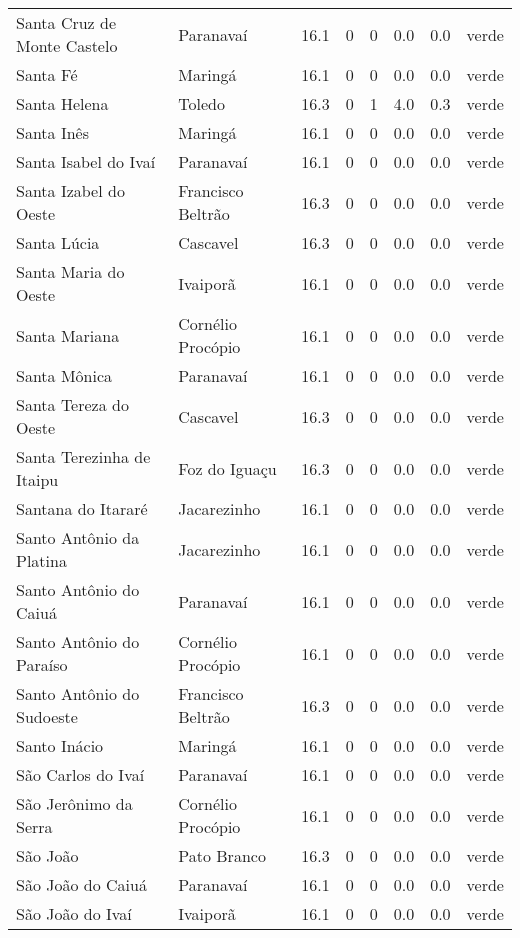 \begin{longtable}{l|lllllll}
  Santa Cruz de Monte Castelo & Paranavaí & 16.1 & 0 & 0 & 0.0 & 0.0 & verde \\ 
  Santa Fé & Maringá & 16.1 & 0 & 0 & 0.0 & 0.0 & verde \\ 
  Santa Helena & Toledo & 16.3 & 0 & 1 & 4.0 & 0.3 & verde \\ 
  Santa Inês & Maringá & 16.1 & 0 & 0 & 0.0 & 0.0 & verde \\ 
  Santa Isabel do Ivaí & Paranavaí & 16.1 & 0 & 0 & 0.0 & 0.0 & verde \\ 
  Santa Izabel do Oeste & Francisco Beltrão & 16.3 & 0 & 0 & 0.0 & 0.0 & verde \\ 
  Santa Lúcia & Cascavel & 16.3 & 0 & 0 & 0.0 & 0.0 & verde \\ 
  Santa Maria do Oeste & Ivaiporã & 16.1 & 0 & 0 & 0.0 & 0.0 & verde \\ 
  Santa Mariana & Cornélio Procópio & 16.1 & 0 & 0 & 0.0 & 0.0 & verde \\ 
  Santa Mônica & Paranavaí & 16.1 & 0 & 0 & 0.0 & 0.0 & verde \\ 
  Santa Tereza do Oeste & Cascavel & 16.3 & 0 & 0 & 0.0 & 0.0 & verde \\ 
  Santa Terezinha de Itaipu & Foz do Iguaçu & 16.3 & 0 & 0 & 0.0 & 0.0 & verde \\ 
  Santana do Itararé & Jacarezinho & 16.1 & 0 & 0 & 0.0 & 0.0 & verde \\ 
  Santo Antônio da Platina & Jacarezinho & 16.1 & 0 & 0 & 0.0 & 0.0 & verde \\ 
  Santo Antônio do Caiuá & Paranavaí & 16.1 & 0 & 0 & 0.0 & 0.0 & verde \\ 
  Santo Antônio do Paraíso & Cornélio Procópio & 16.1 & 0 & 0 & 0.0 & 0.0 & verde \\ 
  Santo Antônio do Sudoeste & Francisco Beltrão & 16.3 & 0 & 0 & 0.0 & 0.0 & verde \\ 
  Santo Inácio & Maringá & 16.1 & 0 & 0 & 0.0 & 0.0 & verde \\ 
  São Carlos do Ivaí & Paranavaí & 16.1 & 0 & 0 & 0.0 & 0.0 & verde \\ 
  São Jerônimo da Serra & Cornélio Procópio & 16.1 & 0 & 0 & 0.0 & 0.0 & verde \\ 
  São João & Pato Branco & 16.3 & 0 & 0 & 0.0 & 0.0 & verde \\ 
  São João do Caiuá & Paranavaí & 16.1 & 0 & 0 & 0.0 & 0.0 & verde \\ 
  São João do Ivaí & Ivaiporã & 16.1 & 0 & 0 & 0.0 & 0.0 & verde \\ 

\end{longtable}
